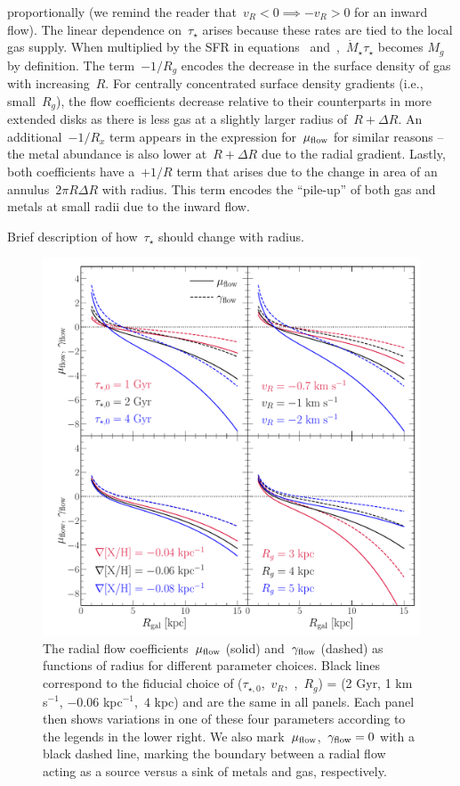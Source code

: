 proportionally (we remind the reader that~$v_R < 0 \implies -v_R > 0$ for an
inward flow).
The linear dependence on~$\tau_\star$ arises because these rates are tied to
the local gas supply.
When multiplied by the SFR in equations~
and~,~$\dot{M}_\star \tau_\star$ becomes
$M_g$ by definition.
The term~$-1 / R_g$ encodes the decrease in the surface density of gas with
increasing~$R$.
For centrally concentrated surface density gradients (i.e., small~$R_g$),
the flow coefficients decrease relative to their counterparts in more extended
disks as there is less gas at a slightly larger radius of~$R + \Delta R$.
An additional~$-1 / R_x$ term appears in the expression for~$\mu_{\text{flow}}$ for
similar reasons -- the metal abundance is also lower at~$R + \Delta R$ due to
the radial gradient.
Lastly, both coefficients have a~$+1 / R$ term that arises due to the change in
area of an annulus~$2 \pi R \Delta R$ with radius.
This term encodes the ``pile-up'' of both gas and metals at small radii due to
the inward flow.
\par
{\color{red} Brief description of how~$\tau_\star$ should change with radius.}

\begin{figure}
\centering
\includegraphics[scale = 0.5]{chapter7/muflow_gammaflow_vs_radius.pdf}
\caption{
The radial flow coefficients~$\mu_{\text{flow}}$ (solid) and~$\gamma_{\text{flow}}$ (dashed) as
functions of radius for different parameter choices.
Black lines correspond to the fiducial choice of
($\tau_{\star,0}$,~$v_R$,~,~$R_g$) = (2 Gyr, 1 km s$^{-1}$,
$-0.06$ kpc$^{-1}$,~$4$ kpc) and are the same in all panels.
Each panel then shows variations in one of these four parameters according to
the legends in the lower right.
We also mark~$\mu_{\text{flow}}$,~$\gamma_{\text{flow}} = 0$ with a black dashed line, marking
the boundary between a radial flow acting as a source versus a sink of metals
and gas, respectively.
}
\label{outflows:fig:flow-coefficients-vs-radius}
\end{figure}

